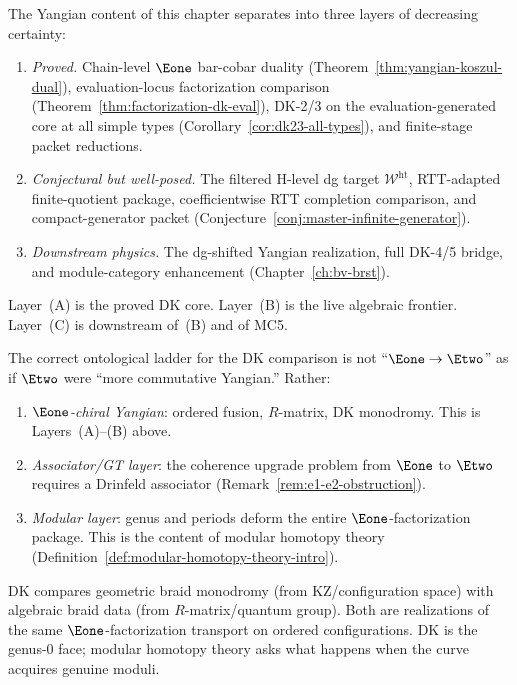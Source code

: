 \begin{remark}
\label{rem:yangian-triage}
The Yangian content of this chapter separates into three layers of
decreasing certainty:
\begin{enumerate}[label=\textup{(\Alph*)}]
\item \emph{Proved.}
  Chain-level $\Eone$ bar-cobar duality
  (Theorem~\ref{thm:yangian-koszul-dual}),
  evaluation-locus factorization comparison
  (Theorem~\ref{thm:factorization-dk-eval}),
  DK-2/3 on the evaluation-generated core at all simple types
  (Corollary~\ref{cor:dk23-all-types}),
  and finite-stage packet reductions.
\item \emph{Conjectural but well-posed.}
  The filtered H-level dg target
  $\mathcal{W}^{\mathrm{ht}}$, RTT-adapted finite-quotient
  package, coefficientwise RTT completion comparison,
  and compact-generator packet
  (Conjecture~\ref{conj:master-infinite-generator}).
\item \emph{Downstream physics.}
  The dg-shifted Yangian realization, full DK-4/5 bridge,
  and module-category enhancement
  (Chapter~\ref{ch:bv-brst}).
\end{enumerate}
Layer~(A) is the proved DK core.  Layer~(B) is the live
algebraic frontier.  Layer~(C) is downstream of~(B) and of
MC5.
\end{remark}

\begin{remark}
\label{rem:dk-e1-factorization}
The correct ontological ladder for the DK comparison is not
``$\Eone \to \Etwo$'' as if $\Etwo$ were ``more commutative
Yangian.''  Rather:
\begin{enumerate}[label=\textup{(\arabic*)}]
\item \emph{$\Eone$-chiral Yangian}: ordered fusion, $R$-matrix,
  DK monodromy.  This is Layers~(A)--(B) above.
\item \emph{Associator/GT layer}: the coherence upgrade problem
  from $\Eone$ to $\Etwo$ requires a Drinfeld associator
  (Remark~\ref{rem:e1-e2-obstruction}).
\item \emph{Modular layer}: genus and periods deform the entire
  $\Eone$-factorization package.  This is the content of modular
  homotopy theory (Definition~\ref{def:modular-homotopy-theory-intro}).
\end{enumerate}
DK compares geometric braid monodromy (from KZ/configuration
space) with algebraic braid data (from $R$-matrix/quantum group).
Both are realizations of the same $\Eone$-factorization transport
on ordered configurations.  DK is the genus-$0$ face; modular
homotopy theory asks what happens when the curve acquires genuine
moduli.
\end{remark}

